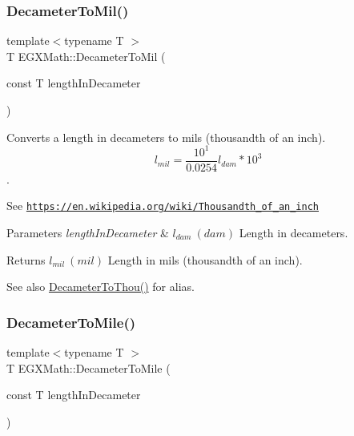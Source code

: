\subsubsection{\texorpdfstring{Decameter\+To\+Mil()}{DecameterToMil()}}
{\footnotesize\ttfamily template$<$typename T $>$ \\
T E\+G\+X\+Math\+::\+Decameter\+To\+Mil (\begin{DoxyParamCaption}\item[{const T}]{length\+In\+Decameter }\end{DoxyParamCaption})}



Converts a length in decameters to mils (thousandth of an inch). \[ l_{mil}= \frac{10^{1}}{0.0254} l_{dam} * 10^{3} \]. 

See \href{https://en.wikipedia.org/wiki/Thousandth_of_an_inch}{\tt https\+://en.\+wikipedia.\+org/wiki/\+Thousandth\+\_\+of\+\_\+an\+\_\+inch} 
\begin{DoxyParams}{Parameters}
{\em length\+In\+Decameter} & $ l_{dam}\ (dam)$ Length in decameters. \\
\hline
\end{DoxyParams}
\begin{DoxyReturn}{Returns}
$ l_{mil}\ (mil)$ Length in mils (thousandth of an inch). 
\end{DoxyReturn}
\begin{DoxySeeAlso}{See also}
\mbox{\hyperlink{group___e_g_x_math-_conversions-_length_conversions-_decameter-_imperial_ga4f21f4b1df62d1d63f46849c4f38d56b}{Decameter\+To\+Thou()}} for alias. 
\end{DoxySeeAlso}
\mbox{\label{group___e_g_x_math-_conversions-_length_conversions-_decameter-_imperial_gac2a54223d869e01fc7a9c73fbf3f2906}} 
\subsubsection{\texorpdfstring{Decameter\+To\+Mile()}{DecameterToMile()}}
{\footnotesize\ttfamily template$<$typename T $>$ \\
T E\+G\+X\+Math\+::\+Decameter\+To\+Mile (\begin{DoxyParamCaption}\item[{const T}]{length\+In\+Decameter }\end{DoxyParamCaption})}



